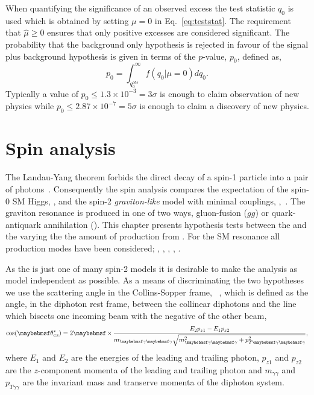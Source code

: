 When quantifying the significance of an observed excess the test statistic $q_{0}$ is used which is obtained by setting $\mu=0$ in Eq.~\ref{eq:teststat}. The requirement that $\hat{\mu}\geq0$ ensures that only positive excesses are considered significant. The probability that the background only hypothesis is rejected in favour of the signal plus background hypothesis is given in terms of the $p$-value, $p_{0}$, defined as,
\begin{equation}
  p_{0} = \int_{q_{0}^{obs}}^{\infty}f(q_{0}|\mu=0)dq_{0}.
  \label{eq:pvalue}
\end{equation}
Typically a value of $p_{0}\leq1.3\times10^{-3}=3\sigma$ is enough to claim observation of new physics while $p_{0}\leq2.87\times10^{-7}=5\sigma$ is enough to claim a discovery of new physics.

\section{Spin analysis}
\label{sec:spin}

The Landau-Yang theorem forbids the direct decay of a spin-1 particle into a pair of photons~\cite{Landau1948,Yang1950}. 
Consequently the spin analysis compares the expectation of the spin-0 SM Higgs, \zerop, and the spin-2 \emph{graviton-like} 
model with minimal couplings, \twomp,~\cite{Gao2010}. The \twomp graviton resonance is produced in one of two ways, gluon-fusion ($gg$) 
or quark-antiquark annihilation (\qqbar). This chapter presents hypothesis tests between the \zerop and the \twomp varying the the amount of 
\twomp production from \qqbar. For the \zerop SM 
resonance all production modes have been considered; \ggH, \VBF, \WH, \ZH, \ttH. 

As the \twomp is just one of many spin-2 models it is desirable to make the analysis as model independent as possible. As a means of 
discriminating the two hypotheses we use the scattering angle in the Collins-Sopper frame, \costhetastar ~\cite{CollinsSoper1977}, which is defined as the angle, in the diphoton rest frame, between the collinear diphotons 
and the line which bisects one incoming beam with the negative of the other beam, 
\begin{equation}
  \cos(\theta^{\ast}_{\mbox{\tiny{CS}}}) = 2\times\frac{E_{2}p_{z1}-E_{1}p_{z2}}{m_{\gamma\gamma}\sqrt{m^{2}_{\gamma\gamma}+p^{2}_{T\gamma\gamma}}},
\end{equation}
where $E_{1}$ and $E_{2}$ are the energies of the leading and trailing photon, $p_{z1}$ and $p_{z2}$ are the $z$-component momenta 
of the leading and trailing photon and $m_{\gamma\gamma}$ and $p_{T\gamma\gamma}$ are the invariant mass and transerve momenta of the diphoton system.

